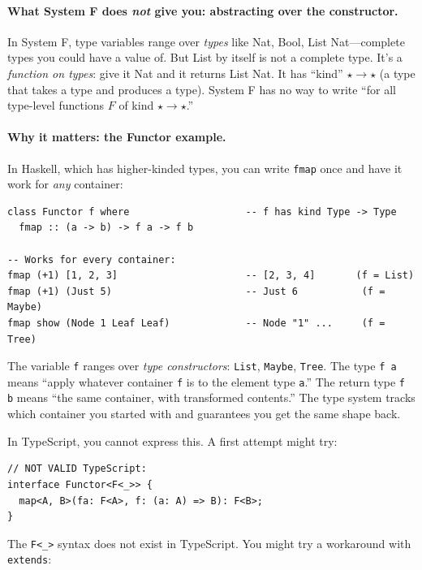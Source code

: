 \documentclass[11pt,a4paper]{article}
\theoremstyle{definition}
\begin{document}
\paragraph{What System F does \emph{not} give you: abstracting over the
constructor.} In System F, type variables range over \emph{types} like
\textsf{Nat}, \textsf{Bool}, \textsf{List Nat}---complete types you could have
a value of. But \textsf{List} by itself is not a complete type. It's a
\emph{function on types}: give it \textsf{Nat} and it returns
\textsf{List Nat}. It has ``kind'' $\star \to \star$ (a type that takes a type
and produces a type). System F has no way to write ``for all type-level
functions $F$ of kind $\star \to \star$.''

\paragraph{Why it matters: the Functor example.}
In Haskell, which has higher-kinded types, you can write \texttt{fmap} once and
have it work for \emph{any} container:

\begin{verbatim}
class Functor f where                    -- f has kind Type -> Type
  fmap :: (a -> b) -> f a -> f b

-- Works for every container:
fmap (+1) [1, 2, 3]                      -- [2, 3, 4]       (f = List)
fmap (+1) (Just 5)                       -- Just 6           (f = Maybe)
fmap show (Node 1 Leaf Leaf)             -- Node "1" ...     (f = Tree)
\end{verbatim}

The variable \texttt{f} ranges over \emph{type constructors}: \texttt{List},
\texttt{Maybe}, \texttt{Tree}. The type \texttt{f a} means ``apply whatever
container \texttt{f} is to the element type \texttt{a}.'' The return type
\texttt{f b} means ``the same container, with transformed contents.'' The type
system tracks which container you started with and guarantees you get the same
shape back.

In TypeScript, you cannot express this. A first attempt might try:

\begin{verbatim}
// NOT VALID TypeScript:
interface Functor<F<_>> {
  map<A, B>(fa: F<A>, f: (a: A) => B): F<B>;
}
\end{verbatim}

The \texttt{F<\_>} syntax does not exist in TypeScript. You might try a
workaround with \texttt{extends}:
\end{document}
